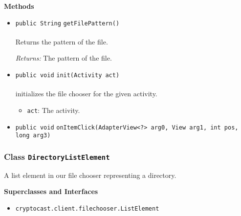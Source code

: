 \textbf{\sffamily Methods}
\begin{itemize}
\item \lstinline|public String| \lstinline|getFilePattern|\lstinline|()|\\ \\[-0.6em]
Returns the pattern of the file.

\emph{Returns:} The pattern of the file.

\item \lstinline|public void| \lstinline|init|\lstinline|(Activity act)|\\ \\[-0.6em]
initializes the file chooser for the given activity.
\begin{itemize}
\item \lstinline|act|: The activity.
\end{itemize}



\item \lstinline|public void| \lstinline|onItemClick|\lstinline|(AdapterView<?> arg0, View arg1, int pos, long arg3)| \\[-0.6em]




\end{itemize}

\subsubsection{Class \lstinline|DirectoryListElement|}
A list element in our file chooser representing a directory. \\
\noindent\begin{minipage}[t]{5cm}
\vspace{0.3em}
\hspace*{2em}
\vspace{0.3em}
\end{minipage}



\textbf{\sffamily Superclasses and Interfaces}
\begin{itemize}
\item \lstinline|cryptocast.client.filechooser.ListElement|
\end{itemize}


